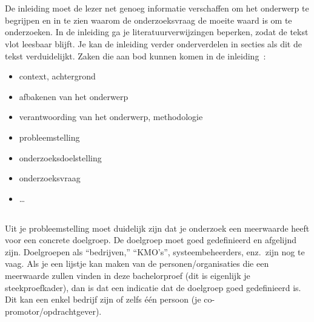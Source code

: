 
\chapter{}%
\label{ch:inleiding}

De inleiding moet de lezer net genoeg informatie verschaffen om het onderwerp te begrijpen en in te zien waarom de onderzoeksvraag de moeite waard is om te onderzoeken. In de inleiding ga je literatuurverwijzingen beperken, zodat de tekst vlot leesbaar blijft. Je kan de inleiding verder onderverdelen in secties als dit de tekst verduidelijkt. Zaken die aan bod kunnen komen in de inleiding~\autocite{Pollefliet2011}:

\begin{itemize}
  \item context, achtergrond
  \item afbakenen van het onderwerp
  \item verantwoording van het onderwerp, methodologie
  \item probleemstelling
  \item onderzoeksdoelstelling
  \item onderzoeksvraag
  \item \ldots
\end{itemize}

\section{}%
\label{sec:probleemstelling}

Uit je probleemstelling moet duidelijk zijn dat je onderzoek een meerwaarde heeft voor een concrete doelgroep. De doelgroep moet goed gedefinieerd en afgelijnd zijn. Doelgroepen als ``bedrijven,'' ``KMO's'', systeembeheerders, enz.~zijn nog te vaag. Als je een lijstje kan maken van de personen/organisaties die een meerwaarde zullen vinden in deze bachelorproef (dit is eigenlijk je steekproefkader), dan is dat een indicatie dat de doelgroep goed gedefinieerd is. Dit kan een enkel bedrijf zijn of zelfs één persoon (je co-promotor/opdrachtgever).

\section{}%
\label{sec:onderzoeksvraag}


